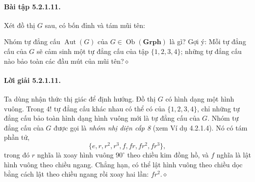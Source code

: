 \paragraph{Bài tập 5.2.1.11.} Xét đồ thị $G$ sau, có bốn đỉnh và tám mũi tên:
\begin{center}\end{center}
Nhóm tự đẳng cấu $\operatorname{Aut}(G)$ của $G\in\operatorname{Ob}(\mathbf{Grph})$ là gì? Gợi ý: Mỗi tự đẳng cấu của $G$ sẽ cảm sinh một tự đẳng cấu của tập $\{1,2,3,4\}$; những tự đẳng cấu nào bảo toàn các đầu mút của mũi tên?\hfill$\diamond$
\paragraph{Lời giải 5.2.1.11.} Ta dùng nhận thức thị giác để định hướng. Đồ thị $G$ có hình dạng một hình vuông. Trong $4!$ tự đẳng cấu khác nhau có thể có của $\{1,2,3,4\}$, chỉ những tự đẳng cấu bảo toàn hình dạng hình vuông mới là tự đẳng cấu của $G$. Nhóm tự đẳng cấu của $G$ được gọi là \emph{nhóm nhị diện cấp 8} (xem Ví dụ 4.2.1.4). Nó có tám phần tử,
\[\{e,r,r^2,r^3,f,fr,fr^2,fr^3\},\]
trong đó $r$ nghĩa là xoay hình vuông $90^\circ$ theo chiều kim đồng hồ, và $f$ nghĩa là lật hình vuông theo chiều ngang. Chẳng hạn, có thể lật hình vuông theo chiều dọc bằng cách lật theo chiều ngang rồi xoay hai lần: $fr^2$.\hfill$\diamond$
